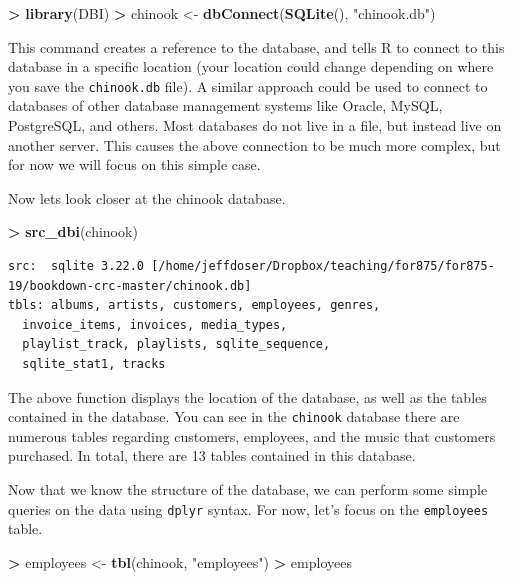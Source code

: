 \documentclass[]{krantz}
\makeatletter
\newenvironment{Shaded}{\begin{snugshade}}{\end{snugshade}}
\newcommand{\KeywordTok}[1]{\textcolor[rgb]{0.27,0.27,0.27}{\textbf{#1}}}
\newcommand{\NormalTok}[1]{#1}
\newcommand{\OperatorTok}[1]{\textcolor[rgb]{0.43,0.43,0.43}{\textbf{#1}}}
\newcommand{\StringTok}[1]{\textcolor[rgb]{0.5,0.5,0.5}{#1}}
\newenvironment{kframe}{%
\medskip{}
\setlength{\fboxsep}{.8em}
 \def\at@end@of@kframe{}%
 \ifinner\ifhmode%
  \def\at@end@of@kframe{\end{minipage}}%
  \begin{minipage}{\columnwidth}%
 \fi\fi%
 \def\FrameCommand##1{\hskip\@totalleftmargin \hskip-\fboxsep
 \colorbox{shadecolor}{##1}\hskip-\fboxsep
     \hskip-\linewidth \hskip-\@totalleftmargin \hskip\columnwidth}%
 \MakeFramed {\advance\hsize-\width
   \@totalleftmargin\z@ \linewidth\hsize
   \@setminipage}}%
 {\par\unskip\endMakeFramed%
 \at@end@of@kframe}
\renewenvironment{Shaded}{\begin{kframe}}{\end{kframe}}
\makeatother
\begin{document}
\begin{Shaded}
\begin{Highlighting}[]
\OperatorTok{>}\StringTok{ }\KeywordTok{library}\NormalTok{(DBI)}
\OperatorTok{>}\StringTok{ }\NormalTok{chinook <-}\StringTok{ }\KeywordTok{dbConnect}\NormalTok{(}\KeywordTok{SQLite}\NormalTok{(), }\StringTok{"chinook.db"}\NormalTok{)}
\end{Highlighting}
\end{Shaded}

This command creates a reference to the database, and tells R to connect to this database in a specific location (your location could change depending on where you save the \texttt{chinook.db} file). A similar approach could be used to connect to databases of other database management systems like Oracle, MySQL, PostgreSQL, and others. Most databases do not live in a file, but instead live on another server. This causes the above connection to be much more complex, but for now we will focus on this simple case.

Now lets look closer at the chinook database.

\begin{Shaded}
\begin{Highlighting}[]
\OperatorTok{>}\StringTok{ }\KeywordTok{src_dbi}\NormalTok{(chinook)}
\end{Highlighting}
\end{Shaded}

\begin{verbatim}
src:  sqlite 3.22.0 [/home/jeffdoser/Dropbox/teaching/for875/for875-19/bookdown-crc-master/chinook.db]
tbls: albums, artists, customers, employees, genres,
  invoice_items, invoices, media_types,
  playlist_track, playlists, sqlite_sequence,
  sqlite_stat1, tracks
\end{verbatim}

The above function displays the location of the database, as well as the tables contained in the database. You can see in the \texttt{chinook} database there are numerous tables regarding customers, employees, and the music that customers purchased. In total, there are 13 tables contained in this database.

Now that we know the structure of the database, we can perform some simple queries on the data using \texttt{dplyr} syntax. For now, let's focus on the \texttt{employees} table.

\begin{Shaded}
\begin{Highlighting}[]
\OperatorTok{>}\StringTok{ }\NormalTok{employees <-}\StringTok{ }\KeywordTok{tbl}\NormalTok{(chinook, }\StringTok{"employees"}\NormalTok{)}
\OperatorTok{>}\StringTok{ }\NormalTok{employees}
\end{Highlighting}
\end{Shaded}
\end{document}
